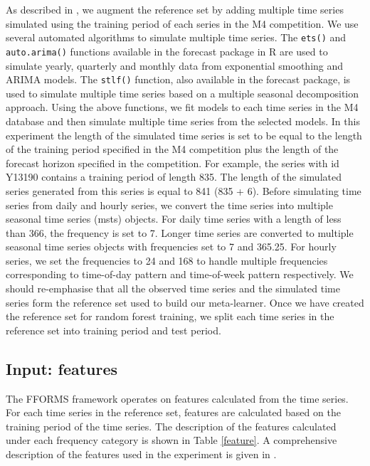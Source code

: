 \documentclass[11pt,a4paper,]{article}
\begin{document}
As described in \textcite{fforms}, we augment the reference set by adding multiple time series simulated using the training period of each series in the M4 competition. We use several automated algorithms to simulate multiple time series. The \texttt{ets()} and \texttt{auto.arima()} functions available in the forecast package in R \autocite{forecast} are used to simulate yearly, quarterly and monthly data from exponential smoothing and ARIMA models. The \texttt{stlf()} function, also available in the forecast package, is used to simulate multiple time series based on a multiple seasonal decomposition approach. Using the above functions, we fit models to each time series in the M4 database and then simulate multiple time series from the selected models. In this experiment the length of the simulated time series is set to be equal to the length of the training
period specified in the M4 competition plus the length of the forecast horizon specified in the competition. For example, the series with id Y13190 contains a training period of length 835. The length of the simulated series generated from this series is equal to 841 (835 + 6). Before simulating time series from daily and hourly series, we convert the time series into multiple seasonal time series (msts) objects. For daily time series with a length of less than 366, the frequency is set to 7. Longer time series are converted to multiple seasonal time series objects with frequencies set to 7 and 365.25. For hourly series, we set the frequencies to 24 and 168 to handle multiple frequencies corresponding to time-of-day pattern and time-of-week pattern respectively. We should re-emphasise that all the observed time series and the simulated time series form the reference set used to build our meta-learner. Once we have created the reference set for random forest training, we split each time series in the reference set into training period and test period.

\hypertarget{input-features}{%
\subsection{Input: features}\label{input-features}}

The FFORMS framework operates on features calculated from the time series. For each time series in the reference set, features are calculated based on the training period of the time series. The description of the features calculated under each frequency category is shown in Table \ref{feature}. A comprehensive description of the features used in the experiment is given in \textcite{fforms}.
\end{document}
